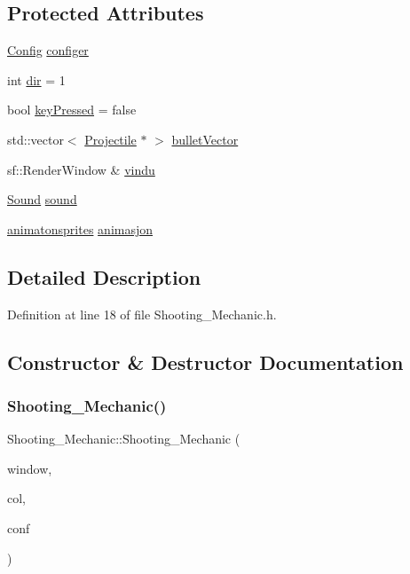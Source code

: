 \subsection*{Protected Attributes}
\begin{DoxyCompactItemize}
\item 
\hyperlink{class_config}{Config} \hyperlink{class_shooting___mechanic_a69eb7f584def4225d9d0047f54489035}{configer}
\item 
int \hyperlink{class_shooting___mechanic_ac278fe303596d7b0f20e28ff8b4a8ed4}{dir} = 1
\item 
bool \hyperlink{class_shooting___mechanic_a7c7d3ab2cad3c1cecf5e167021960128}{key\+Pressed} = false
\item 
std\+::vector$<$ \hyperlink{class_projectile}{Projectile} $\ast$ $>$ \hyperlink{class_shooting___mechanic_a9fb5ad128dfb480bbb8174b07be01d92}{bullet\+Vector}
\item 
sf\+::\+Render\+Window \& \hyperlink{class_shooting___mechanic_a74fc67d9d6a2840ca3f2500b964cc3e4}{vindu}
\item 
\hyperlink{class_sound}{Sound} \hyperlink{class_shooting___mechanic_aae7e73612b2103509fb73b11f0a24b70}{sound}
\item 
\hyperlink{classanimatonsprites}{animatonsprites} \hyperlink{class_shooting___mechanic_af5bec55c10082be57809d48c1c83254c}{animasjon}
\end{DoxyCompactItemize}


\subsection{Detailed Description}


Definition at line 18 of file Shooting\+\_\+\+Mechanic.\+h.



\subsection{Constructor \& Destructor Documentation}
\hypertarget{class_shooting___mechanic_a2c1defa547e5b53d057a5296d6776107}{}\label{class_shooting___mechanic_a2c1defa547e5b53d057a5296d6776107} 
\subsubsection{\texorpdfstring{Shooting\+\_\+\+Mechanic()}{Shooting\_Mechanic()}}
{\footnotesize\ttfamily Shooting\+\_\+\+Mechanic\+::\+Shooting\+\_\+\+Mechanic (\begin{DoxyParamCaption}\item[{sf\+::\+Render\+Window \&}]{window,  }\item[{\hyperlink{class_collision}{Collision} $\ast$}]{col,  }\item[{\hyperlink{class_config}{Config}}]{conf }\end{DoxyParamCaption})}



